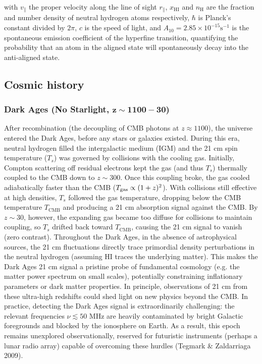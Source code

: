 \documentclass[floats,floatfix,showpacs,amssymb,prd,superscriptaddress,nofootinbib]{revtex4-2} %
\begin{document}
\noindent with $v_\parallel$ the proper velocity along the line of sight $r_\parallel$, $x_{\mathrm{HI}}$ and $n_{\mathrm{H}}$ are the fraction and number density of neutral hydrogen atoms respectively, $\hbar$ is Planck's constant divided by $2\pi$, $c$ is the speed of light, and $A_{10} = 2.85 \times 10^{-15} \text{s}^{-1}$ is the spontaneous emission coefficient of the hyperfine transition, quantifying the probability that an atom in the aligned state will spontaneously decay into the anti-aligned state. 

\subsection{Cosmic history}
\subsubsection{Dark Ages (No Starlight, $\mathbf{z \sim 1100-30}$)}
After recombination (the decoupling of CMB photons at $z \approx 1100$), the universe entered the Dark Ages, before any stars or galaxies existed. During this era, neutral hydrogen filled the intergalactic medium (IGM) and the 21 cm spin temperature ($T_s$) was governed by collisions with the cooling gas. Initially, Compton scattering off residual electrons kept the gas (and thus $T_s$) thermally coupled to the CMB down to $z\sim300$. Once this coupling broke, the gas cooled adiabatically faster than the CMB (${T_{\rm gas}}\propto(1+z)^2$). With collisions still effective at high densities, $T_s$ followed the gas temperature, dropping below the CMB temperature $T_{\text{CMB}}$ and producing a 21 cm absorption signal against the CMB. By $z\sim30$, however, the expanding gas became too diffuse for collisions to maintain coupling, so $T_s$ drifted back toward $T_{\text{CMB}}$, causing the 21 cm signal to vanish (zero contrast). Throughout the Dark Ages, in the absence of astrophysical sources, the 21 cm fluctuations directly trace primordial density perturbations in the neutral hydrogen (assuming HI traces the underlying matter). This makes the Dark Ages 21 cm signal a pristine probe of fundamental cosmology (e.g. the matter power spectrum on small scales), potentially constraining inflationary parameters or dark matter properties.
In principle, observations of 21 cm from these ultra-high redshifts could shed light on new physics beyond the CMB.
In practice, detecting the Dark Ages signal is extraordinarily challenging: the relevant frequencies $\nu \lesssim 50$ MHz are heavily contaminated by bright Galactic foregrounds and blocked by the ionosphere on Earth. As a result, this epoch remains unexplored observationally, reserved for futuristic instruments (perhaps a lunar radio array) capable of overcoming these hurdles (Tegmark \& Zaldarriaga 2009).
\end{document}

